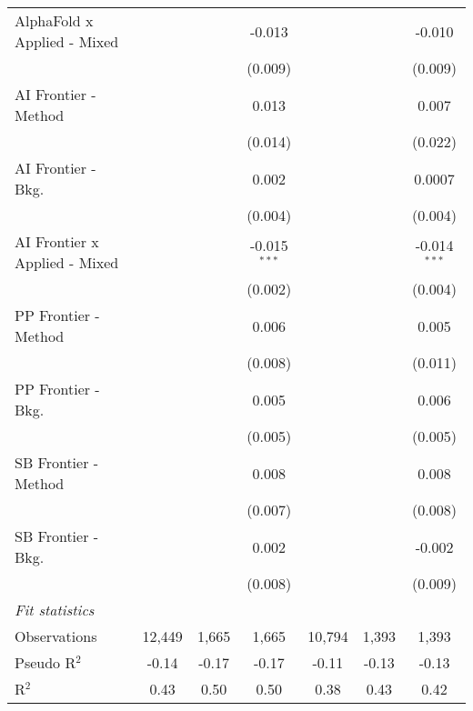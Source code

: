 \begin{tabular}{lcccccc}
   AlphaFold x Applied - Mixed   &              &             & -0.013         &              &         & -0.010\\   
                                 &              &             & (0.009)        &              &         & (0.009)\\   
   AI Frontier - Method          &              &             & 0.013          &              &         & 0.007\\   
                                 &              &             & (0.014)        &              &         & (0.022)\\   
   AI Frontier - Bkg.            &              &             & 0.002          &              &         & 0.0007\\   
                                 &              &             & (0.004)        &              &         & (0.004)\\   
   AI Frontier x Applied - Mixed &              &             & -0.015$^{***}$ &              &         & -0.014$^{***}$\\   
                                 &              &             & (0.002)        &              &         & (0.004)\\   
   PP Frontier - Method          &              &             & 0.006          &              &         & 0.005\\   
                                 &              &             & (0.008)        &              &         & (0.011)\\   
   PP Frontier - Bkg.            &              &             & 0.005          &              &         & 0.006\\   
                                 &              &             & (0.005)        &              &         & (0.005)\\   
   SB Frontier - Method          &              &             & 0.008          &              &         & 0.008\\   
                                 &              &             & (0.007)        &              &         & (0.008)\\   
   SB Frontier - Bkg.            &              &             & 0.002          &              &         & -0.002\\   
                                 &              &             & (0.008)        &              &         & (0.009)\\   
   \midrule
   \emph{Fit statistics}\\
   Observations                  & 12,449       & 1,665       & 1,665          & 10,794       & 1,393   & 1,393\\  
   Pseudo R$^2$                  & -0.14        & -0.17       & -0.17          & -0.11        & -0.13   & -0.13\\  
   R$^2$                         & 0.43         & 0.50        & 0.50           & 0.38         & 0.43    & 0.42\\  
   

\end{tabular}
